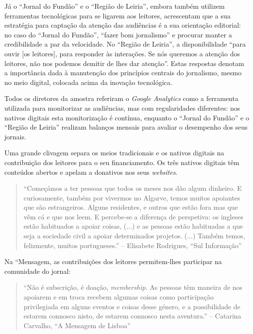 \documentclass[portuguese]{textolivre}
\begin{document}
Já o ``Jornal do Fundão'' e o ``Região de Leiria'', embora também
utilizem ferramentas tecnológicas para se ligarem aos leitores,
acrescentam que a sua estratégia para captação da atenção das audiências
é a sua orientação editorial: no caso do ``Jornal do Fundão'', ``fazer
bom jornalismo'' e procurar manter a credibilidade a par da velocidade.
No ``Região de Leiria'', a disponibilidade ``para ouvir {[}os
leitores{]}, para responder às interações. Se nós queremos a atenção dos
leitores, não nos podemos demitir de lhes dar atenção''. Estas respostas
denotam a importância dada à manutenção dos princípios centrais do
jornalismo, mesmo no meio digital, colocada acima da inovação
tecnológica.

Todos os diretores da amostra referiram o \emph{Google Analytics }como a
ferramenta utilizada para monitorizar as audiências, mas com
regularidades diferentes: nos nativos digitais esta monitorização é
contínua, enquanto o ``Jornal do Fundão'' e o ``Região de Leiria''
realizam balanços mensais para avaliar o desempenho dos seus jornais.

Uma grande clivagem separa os meios tradicionais e os nativos digitais
na contribuição dos leitores para o seu financiamento. Os três nativos
digitais têm conteúdos abertos e apelam a donativos nos seus
\emph{websites}.

\begin{quote}
``Começámos a ter pessoas que todos os meses nos dão algum dinheiro. E
curiosamente, também por vivermos no Algarve, temos muitos apoiantes que
são estrangeiros. Alguns residentes, e outros que estão fora mas que vêm
cá e que nos leem. E percebe-se a diferença de perspetiva: os ingleses
estão habituados a apoiar coisas, (...) e as pessoas estão habituadas a
que seja a sociedade civil a apoiar determinados projetos. (...) Também
temos, felizmente, muitos portugueses.'' -- Elisabete Rodrigues, ``Sul
Informação''
\end{quote}

Na ``Mensagem, as contribuições dos leitores permitem-lhes participar na
comunidade do jornal:

\begin{quote}
``Não é subscrição, é doação, \emph{membership}. As pessoas têm maneira
de nos apoiarem e em troca recebem algumas coisas como participação
privilegiada em alguns eventos e coisas desse género, e a possibilidade
de estarem connosco nisto, de estarem connosco nesta aventura.'' --
Catarina Carvalho, ``A Mensagem de Lisboa''
\end{quote}
\end{document}
